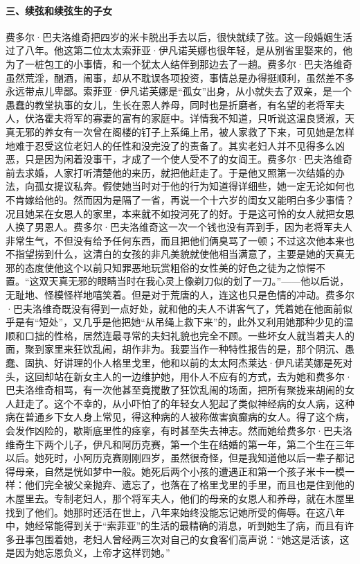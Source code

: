 \paragraph*{三、续弦和续弦生的子女}
\par 费多尔·巴夫洛维奇把四岁的米卡脱出手去以后，很快就续了弦。这一段婚姻生活过了八年。他这第二位太太索菲亚·伊凡诺芙娜也很年轻，是从别省里娶来的，他为了一桩包工的小事情，和一个犹太人结伴到那边去了一趟。费多尔·巴夫洛维奇虽然荒淫，酗酒，闹事，却从不耽误各项投资，事情总是办得挺顺利，虽然差不多永远带点儿卑鄙。索菲亚·伊凡诺芙娜是“孤女”出身，从小就失去了双亲，是一个愚蠢的教堂执事的女儿，生长在恩人养母，同时也是折磨者，有名望的老将军夫人，伏洛霍夫将军的寡妻的富有的家庭中。详情我不知道，只听说这温良贤淑，天真无邪的养女有一次曾在阁楼的钉子上系绳上吊，被人家救了下来，可见她是怎样地难于忍受这位老妇人的任性和没完没了的责备了。其实老妇人并不见得多么凶恶，只是因为闲着没事干，才成了一个使人受不了的女阎王。费多尔·巴夫洛维奇前去求婚，人家打听清楚他的来历，就把他赶走了。于是他又照第一次结婚的办法，向孤女提议私奔。假使她当时对于他的行为知道得详细些，她一定无论如何也不肯嫁给他的。然而因为是隔了一省，再说一个十六岁的闺女又能明白多少事情？况且她呆在女恩人的家里，本来就不如投河死了的好。于是这可怜的女人就把女恩人换了男恩人。费多尔·巴夫洛维奇这一次一个钱也没有弄到手，因为老将军夫人非常生气，不但没有给予任何东西，而且把他们俩臭骂了一顿；不过这次他本来也不指望捞到什么，这清白的女孩的非凡美貌就使他相当满意了，主要是她的天真无邪的态度使他这个以前只知罪恶地玩赏粗俗的女性美的好色之徒为之惊愕不置。“这双天真无邪的眼睛当时在我心灵上像剃刀似的划了一刀。”——他以后说，无耻地、怪模怪样地嘻笑着。但是对于荒唐的人，连这也只是色情的冲动。费多尔·巴夫洛维奇既没有得到一点好处，就和他的夫人不讲客气了，凭着她在他面前似乎是有“短处”，又几乎是他把她“从吊绳上救下来”的，此外又利用她那种少见的温顺和口拙的性格，居然连最寻常的夫妇礼貌也完全不顾。一些坏女人就当着夫人的面，聚到家里来狂饮乱闹，胡作非为。我要当作一种特性报告的是，那个阴沉、愚蠢、固执、好讲理的仆人格里戈里，他和以前的太太阿杰莱达·伊凡诺芙娜是死对头，这回却站在新女主人的一边维护她，用仆人不应有的方式，去为她和费多尔·巴夫洛维奇相骂，有一次他甚至竟搅散了狂饮乱闹的场面，把所有聚拢来胡闹的女人赶走了。这个不幸的，从小吓怕了的年轻女人犯起了类似神经病的女人病，这种病在普通乡下女人身上常见，得这种病的人被称做害疯癫病的女人。得了这个病，会发作凶险的，歇斯底里性的痉挛，有时甚至失去神志。然而她给费多尔·巴夫洛维奇生下两个儿子，伊凡和阿历克赛，第一个生在结婚的第一年，第二个生在三年以后。她死时，小阿历克赛刚刚四岁，虽然很奇怪，但是我知道他以后一辈子都记得母亲，自然是恍如梦中一般。她死后两个小孩的遭遇正和第一个孩子米卡一模一样：他们完全被父亲抛弃、遗忘了，也落在了格里戈里的手里，而且也是住到他的木屋里去。专制老妇人，那个将军夫人，他们的母亲的女恩人和养母，就在木屋里找到了他们。她那时还活在世上，八年来始终没能忘记她所受的侮辱。在这八年中，她经常能得到关于“索菲亚”的生活的最精确的消息，听到她生了病，而且有许多丑事包围着她，老妇人曾经两三次对自己的女食客们高声说：“她这是活该，这是因为她忘恩负义，上帝才这样罚她。”
